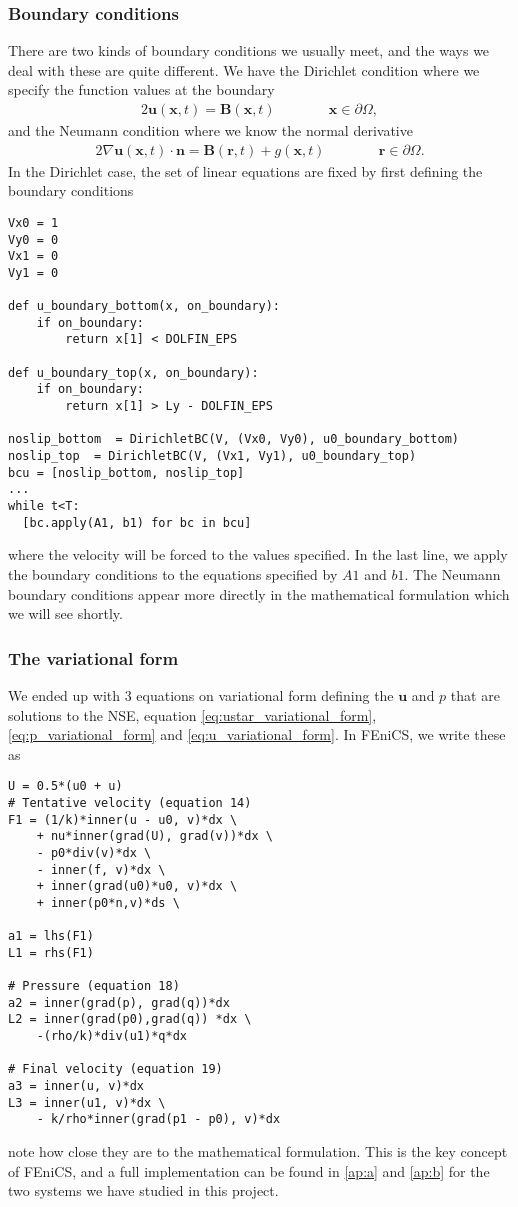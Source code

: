 \documentclass[a4paper,10pt]{article}
\renewcommand{\vec}[1]{\mathbf{#1}}
\renewcommand{\(}{\left(}
\renewcommand{\)}{\right)}
\begin{document}
\subsubsection{Boundary conditions}
There are two kinds of boundary conditions we usually meet, and the ways we deal with these are quite different. We have the Dirichlet condition where we specify the function values at the boundary
\begin{alignat*}{2}
  \vec u(\vec x,t) = \vec B(\vec x,t) & \qquad \quad \vec x \in \partial \Omega,
\end{alignat*}
and the Neumann condition where we know the normal derivative
\begin{alignat*}{2}
  \nabla\vec u(\vec x,t)\cdot\vec n = \vec B(\vec r,t) + g(\vec x,t) & \qquad \quad \vec r \in \partial \Omega.
\end{alignat*}
In the Dirichlet case, the set of linear equations are fixed by first defining the boundary conditions
\begin{lstlisting}
Vx0 = 1
Vy0 = 0
Vx1 = 0
Vy1 = 0

def u_boundary_bottom(x, on_boundary):
    if on_boundary:
        return x[1] < DOLFIN_EPS

def u_boundary_top(x, on_boundary):
    if on_boundary:
        return x[1] > Ly - DOLFIN_EPS

noslip_bottom  = DirichletBC(V, (Vx0, Vy0), u0_boundary_bottom)
noslip_top  = DirichletBC(V, (Vx1, Vy1), u0_boundary_top)
bcu = [noslip_bottom, noslip_top]
...
while t<T:
  [bc.apply(A1, b1) for bc in bcu]
\end{lstlisting}
where the velocity will be forced to the values specified. In the last line, we apply the boundary conditions to the equations specified by $A1$ and $b1$. The Neumann boundary conditions appear more directly in the mathematical formulation which we will see shortly.
\subsubsection{The variational form}
We ended up with 3 equations on variational form defining the $\vec u$ and $p$ that are solutions to the NSE, equation \eqref{eq:ustar_variational_form}, \eqref{eq:p_variational_form} and \eqref{eq:u_variational_form}. In FEniCS, we write these as
\begin{lstlisting}
U = 0.5*(u0 + u)
# Tentative velocity (equation 14)
F1 = (1/k)*inner(u - u0, v)*dx \
    + nu*inner(grad(U), grad(v))*dx \
    - p0*div(v)*dx \
    - inner(f, v)*dx \
    + inner(grad(u0)*u0, v)*dx \
    + inner(p0*n,v)*ds \
    
a1 = lhs(F1)
L1 = rhs(F1)

# Pressure (equation 18)
a2 = inner(grad(p), grad(q))*dx
L2 = inner(grad(p0),grad(q)) *dx \
    -(rho/k)*div(u1)*q*dx

# Final velocity (equation 19)
a3 = inner(u, v)*dx
L3 = inner(u1, v)*dx \
    - k/rho*inner(grad(p1 - p0), v)*dx
\end{lstlisting}
note how close they are to the mathematical formulation. This is the key concept of FEniCS, and a full implementation can be found in \ref{ap:a} and \ref{ap:b} for the two systems we have studied in this project.
\end{document}
